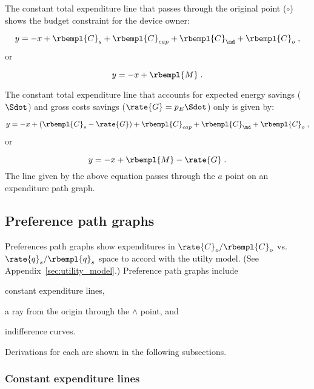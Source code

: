 The constant total expenditure line 
that passes through the original point ($\circ$)
shows the budget constraint for the device owner:

\begin{equation}
  y = -x + \rbempl{C}_s + \rbempl{C}_{cap} + \rbempl{C}_{\md} + \rbempl{C}_o \; ,
\end{equation}
%
or

\begin{equation}
  y = -x + \rbempl{M} \; .
\end{equation}

The constant total expenditure line 
that accounts for expected energy savings ($\Sdot$) 
and gross costs savings ($\rate{G} = p_E \Sdot$) only 
is given by:

\begin{equation}
  y = -x + (\rbempl{C}_s - \rate{G}) + \rbempl{C}_{cap} + \rbempl{C}_{\md} + \rbempl{C}_o \; ,
\end{equation}
%
or

\begin{equation}
  y = -x + \rbempl{M} - \rate{G}\; .
\end{equation}
%
The line given by the above equation
passes through the $a$ point on an expenditure path graph.


\subsection{Preference path graphs}
\label{sec:prefs_path_graph_details}

Preferences path graphs show expenditures in 
$\rate{C}_o/\rbempl{C}_o$ vs.\ $\rate{q}_s/\rbempl{q}_s$ space
to accord with the utilty model.
(See Appendix~\ref{sec:utility_model}.)
Preference path graphs include 
%
\begin{enumerate*}[label={(\alph*)}]
	
  \item constant expenditure lines,
  
  \item a ray from the origin through the $\wedge$ point, and 
  
  \item indifference curves.
    
\end{enumerate*}
%
Derivations for each are shown in the following subsections.


\subsubsection{Constant expenditure lines} 
\label{sec:pref_graph_constant_expenditure_lines}

